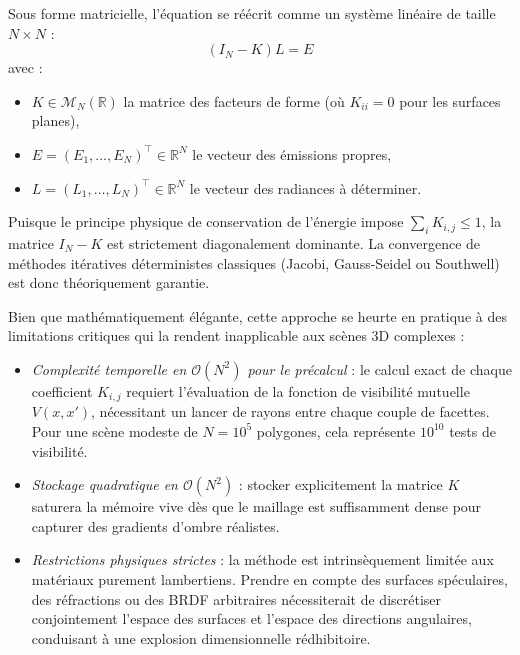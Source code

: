 Sous forme matricielle, l'équation se réécrit comme un système linéaire de taille $N \times N$ :
\begin{equation}
    (I_N - K) L = E
\end{equation}
avec :
\begin{itemize}
    \item $K \in \mathcal{M}_N(\mathbb{R})$ la matrice des facteurs de forme (où $K_{ii} = 0$ pour les surfaces planes),
    \item $E = (E_1, \dots, E_N)^\top \in \mathbb{R}^N$ le vecteur des émissions propres,
    \item $L = (L_1, \dots, L_N)^\top \in \mathbb{R}^N$ le vecteur des radiances à déterminer.
\end{itemize}

Puisque le principe physique de conservation de l'énergie impose $\sum_i K_{i,j} \leqslant 1$, la matrice $I_N - K$ est strictement diagonalement dominante. La convergence de méthodes itératives déterministes classiques (Jacobi, Gauss-Seidel ou Southwell) est donc théoriquement garantie.

\begin{remark}
    Bien que mathématiquement élégante, cette approche se heurte en pratique à des limitations critiques qui la rendent inapplicable aux scènes 3D complexes :
    \begin{itemize}
        \item \emph{Complexité temporelle en $\mathcal{O}(N^2)$ pour le précalcul} : le calcul exact de chaque coefficient $K_{i,j}$ requiert l'évaluation de la fonction de visibilité mutuelle $V(x, x')$, nécessitant un lancer de rayons entre chaque couple de facettes. Pour une scène modeste de $N = 10^5$ polygones, cela représente $10^{10}$ tests de visibilité.
        \item \emph{Stockage quadratique en $\mathcal{O}(N^2)$} : stocker explicitement la matrice $K$ saturera la mémoire vive dès que le maillage est suffisamment dense pour capturer des gradients d'ombre réalistes. 
        \item \emph{Restrictions physiques strictes} : la méthode est intrinsèquement limitée aux matériaux purement lambertiens. Prendre en compte des surfaces spéculaires, des réfractions ou des BRDF arbitraires nécessiterait de discrétiser conjointement l'espace des surfaces et l'espace des directions angulaires, conduisant à une explosion dimensionnelle rédhibitoire.
    \end{itemize}
\end{remark}

